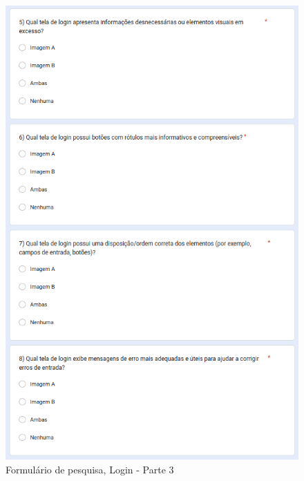 \begin{figure}[!h]
	\begin{center}
	    \includegraphics[scale=0.6]{figs/Form/07.png}
	\end{center}
	\caption{\label{AP_LP03}Formulário de pesquisa, Login - Parte 3}
\end{figure}

\newpage

